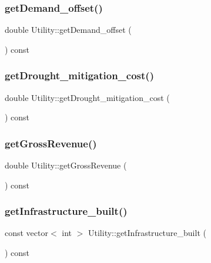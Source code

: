 \subsubsection{\texorpdfstring{get\+Demand\+\_\+offset()}{getDemand\_offset()}}
{\footnotesize\ttfamily double Utility\+::get\+Demand\+\_\+offset (\begin{DoxyParamCaption}{ }\end{DoxyParamCaption}) const}

\mbox{\label{classUtility_a27dc0aeabdcb9fdb5a7d388e67e905f8}} 
\subsubsection{\texorpdfstring{get\+Drought\+\_\+mitigation\+\_\+cost()}{getDrought\_mitigation\_cost()}}
{\footnotesize\ttfamily double Utility\+::get\+Drought\+\_\+mitigation\+\_\+cost (\begin{DoxyParamCaption}{ }\end{DoxyParamCaption}) const}

\mbox{\label{classUtility_a2903344b317f0949014c687d285b64b6}} 
\subsubsection{\texorpdfstring{get\+Gross\+Revenue()}{getGrossRevenue()}}
{\footnotesize\ttfamily double Utility\+::get\+Gross\+Revenue (\begin{DoxyParamCaption}{ }\end{DoxyParamCaption}) const}

\mbox{\label{classUtility_aa4ba8f1d43faa9c2aea8a0d17ad2a996}} 
\subsubsection{\texorpdfstring{get\+Infrastructure\+\_\+built()}{getInfrastructure\_built()}}
{\footnotesize\ttfamily const vector$<$ int $>$ Utility\+::get\+Infrastructure\+\_\+built (\begin{DoxyParamCaption}{ }\end{DoxyParamCaption}) const}

